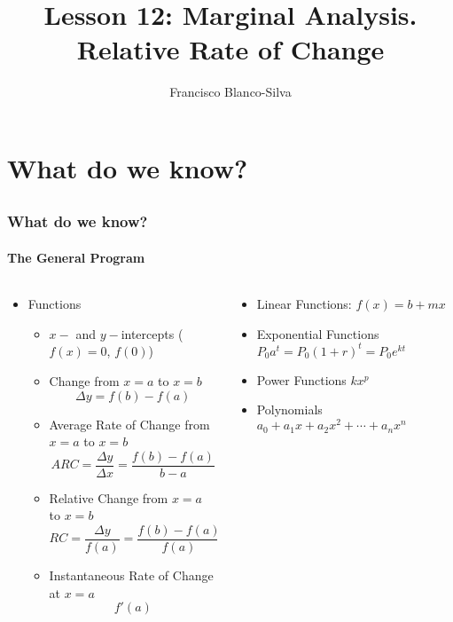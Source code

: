 \documentclass[9pt,xcolor=x11names,compress]{beamer}
\title{Lesson 12: Marginal Analysis.  Relative Rate of Change}
\author[Francisco Blanco-Silva]{Francisco Blanco-Silva}
\institute[USC]{University of South Carolina}
\date{
\pgfdeclarelindenmayersystem{plant}{
	\rule{X -> F-[[X]+x]+F[+FX]-X}
	\rule{F -> FF}
}
\begin{tikzpicture}[color=DeepSkyBlue4,rotate=74]
    \draw [l-system={plant, axiom=X, order=6, step=0.5pt, angle=15}]
    lindenmayer system; 
	\end{tikzpicture}
	\begin{tikzpicture}[color=DeepSkyBlue4,rotate=74]
    \draw [l-system={plant, axiom=X, order=6, step=0.5pt, angle=25}] lindenmayer system;
	\end{tikzpicture}
	\begin{tikzpicture}[color=DeepSkyBlue4,rotate=74]
    \draw [l-system={plant, axiom=X, order=6, step=0.5pt, angle=30}] lindenmayer system;
	\end{tikzpicture}
}
\begin{document}
\frame{\titlepage}

\section{What do we know?}
\subsection{}

\begin{frame}
\frametitle{What do we know?}
\framesubtitle{The General Program}
\begin{columns}[T]
\begin{column}{0.6\linewidth}
\begin{itemize}
\item Functions
\begin{itemize}
\item $x-$ and $y-$\alert{intercepts} ($f(x)=0$, $f(0)$)
\item \alert{Change} from $x=a$ to $x=b$ 
\begin{equation*}
	\Delta y = f(b)-f(a)
\end{equation*}
\item \alert{Average Rate of Change} from $x=a$ to $x=b$
\begin{equation*}
ARC=\frac{\Delta y}{\Delta x}=\frac{f(b)-f(a)}{b-a} 
\end{equation*}
\item \alert{Relative Change} from $x=a$ to $x=b$
\begin{equation*}
RC=\frac{\Delta y}{f(a)}=\frac{f(b)-f(a)}{f(a)}
\end{equation*}
\item \alert{Instantaneous Rate of Change} at $x=a$
\begin{equation*}
	f'(a)
\end{equation*}
\end{itemize}
\end{itemize}
\end{column}
\begin{column}{0.4\linewidth}
\begin{itemize}
	\item Linear Functions: $f(x)=b+mx$
	\item Exponential Functions $P_0 a^t = P_0 (1+r)^t = P_0 e^{kt}$
	\item Power Functions \newline \makebox[1cm]{} $kx^p$
	\item Polynomials $a_0+a_1x+a_2x^2+\dotsb+a_n x^n$
\end{itemize}
\end{column}
\end{columns}
\end{frame}
\end{document}
